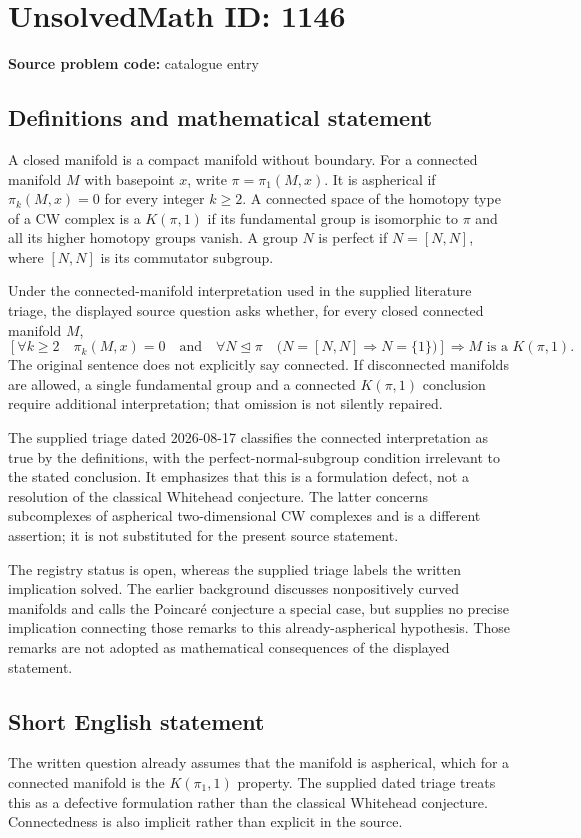 \documentclass[11pt]{article}
\begin{document}
\section*{UnsolvedMath ID: 1146}
\textbf{Source problem code:} catalogue entry
\subsection{Definitions and mathematical statement}
A closed manifold is a compact manifold without boundary. For a connected manifold \(M\) with basepoint \(x\), write \(\pi=\pi_1(M,x)\). It is aspherical if \(\pi_k(M,x)=0\) for every integer \(k\geq2\). A connected space of the homotopy type of a CW complex is a \(K(\pi,1)\) if its fundamental group is isomorphic to \(\pi\) and all its higher homotopy groups vanish. A group \(N\) is perfect if \(N=[N,N]\), where \([N,N]\) is its commutator subgroup.

Under the connected-manifold interpretation used in the supplied literature triage, the displayed source question asks whether, for every closed connected manifold \(M\),
\[
\left[
\forall k\geq2\quad \pi_k(M,x)=0
\quad\text{and}\quad
\forall N\trianglelefteq\pi\quad
\bigl(N=[N,N]\Longrightarrow N=\{1\}\bigr)
\right]
\Longrightarrow M\text{ is a }K(\pi,1).
\]
The original sentence does not explicitly say connected. If disconnected manifolds are allowed, a single fundamental group and a connected \(K(\pi,1)\) conclusion require additional interpretation; that omission is not silently repaired.

The supplied triage dated 2026-08-17 classifies the connected interpretation as true by the definitions, with the perfect-normal-subgroup condition irrelevant to the stated conclusion. It emphasizes that this is a formulation defect, not a resolution of the classical Whitehead conjecture. The latter concerns subcomplexes of aspherical two-dimensional CW complexes and is a different assertion; it is not substituted for the present source statement.

The registry status is open, whereas the supplied triage labels the written implication solved. The earlier background discusses nonpositively curved manifolds and calls the Poincar\'e conjecture a special case, but supplies no precise implication connecting those remarks to this already-aspherical hypothesis. Those remarks are not adopted as mathematical consequences of the displayed statement.
\subsection{Short English statement}
The written question already assumes that the manifold is aspherical, which for a connected manifold is the \(K(\pi_1,1)\) property. The supplied dated triage treats this as a defective formulation rather than the classical Whitehead conjecture. Connectedness is also implicit rather than explicit in the source.
\end{document}
